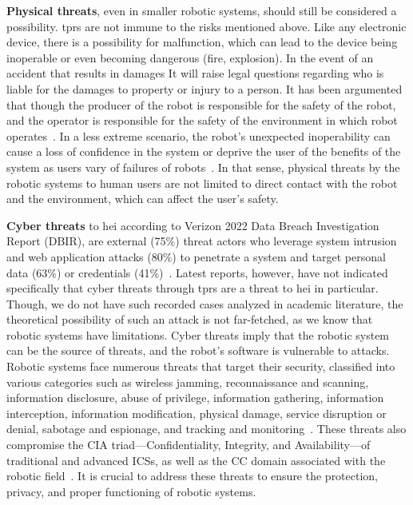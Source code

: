 \textbf{Physical threats}, even in smaller robotic systems, should still be considered a possibility. \ac{tprs} are not immune to the risks mentioned above. Like any electronic device, there is a possibility for malfunction, which can lead to the device being inoperable or even becoming dangerous (fire, explosion). In the event of an accident that results in damages
It will raise legal questions regarding who is liable for the damages to property or injury to a person. It has been argumented that though
the producer of the robot is responsible for the safety of the robot, and the operator is responsible for the safety of the environment in
which robot operates~\cite[]{if_robots_cause_harm_2016}. In a less extreme scenario, the robot's unexpected inoperability can cause a loss
of confidence in the system or deprive the user of the benefits of the system as users vary of failures of robots~\cite[9-10]{
  higher_edu_perception_on_tprs_2022}. In that sense, physical threats by the robotic systems to human users are not limited to
direct contact with the robot and the environment, which can affect the user's safety.

\textbf{Cyber threats} to \ac{hei} according to Verizon 2022 Data Breach Investigation Report (DBIR), are external (75\%) threat actors
who leverage system intrusion and web application attacks
(80\%) to penetrate a system and target personal data (63\%) or credentials (41\%)~\cite[57]{dbir_2022}. Latest reports, however, have not
indicated specifically that cyber threats through \ac{tprs} are a threat to \ac{hei} in particular. Though, we do not
have such recorded cases analyzed in academic literature, the theoretical possibility of such an attack is not far-fetched, as we
know that robotic systems have limitations. Cyber threats imply that the robotic system can be the source of threats, and the robot's software is vulnerable to attacks. Robotic systems face numerous threats that target their security, classified into various categories such as wireless jamming,
reconnaissance and scanning, information disclosure, abuse of privilege, information gathering, information interception, information
modification, physical damage, service disruption or denial, sabotage and espionage, and tracking and monitoring~\cite[122]{robotics_cyber_security_2022}. These threats also
compromise the CIA triad—Confidentiality, Integrity, and Availability—of traditional and advanced \ac{ICSs}, as
well as the \ac{CC} domain associated with the robotic field~\cite[116]{robotics_cyber_security_2022}. It is crucial to address these threats to ensure the protection, privacy, and proper functioning of robotic systems.

